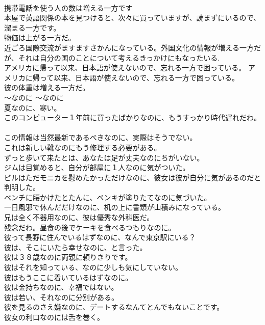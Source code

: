 \documentclass[8pt]{extreport}
\begin{document}
\begin{CJK}{UTF8}{min}
\\	携帯電話を使う人の数は増える一方です  
\\	本屋で英語関係の本を見つけると、次々に買っていますが、読まずにいるので、溜まる一方です。  
\\	物価は上がる一方だ。  
\\	近ごろ国際交流がますますさかんになっている。外国文化の情報が増える一方だが、それは自分の国のことについて考えるきっかけにもなったいる.  
\\	アメリカに帰って以来、日本語が使えないので、忘れる一方で困っている。 アメリカに帰って以来、日本語が使えないので、忘れる一方で困っている。  
\\	彼の体重は増える一方だ。  
\\	〜なのに	〜なのに	
\\	夏なのに、寒い。	
\\	このコンピューター１年前に買ったばかりなのに、もうすっかり時代遅れだわ。   
\\	この情報は当然最新であるべきなのに、実際はそうでない。   
\\	これは新しい靴なのにもう修理する必要がある。   
\\	ずっと歩いて来たとは、あなたは足が丈夫なのにちがいない。   
\\	ジムは目覚めると、自分が部屋に１人なのに気がついた。   
\\	ビルはただモニカを慰めたかっただけなのに、彼女は彼が自分に気があるのだと判明した。   
\\	ベンチに腰かけたとたんに、ペンキが塗りたてなのに気づいた。   
\\	一日風邪で休んだだけなのに、机の上に書類が山積みになっている。   
\\	兄は全く不器用なのに、彼は優秀な外科医だ。   
\\	残念だわ。昼食の後でケーキを食べるつもりなのに。   
\\	彼って長野に住んでいるはずなのに、なんで東京駅にいる？   
\\	彼は、そこにいたら幸せなのに、と言った。   
\\	彼は３８歳なのに両親に頼りきりです。   
\\	彼はそれを知っている、なのに少しも気にしていない。   
\\	彼はもうここに着いているはずなのに。   
\\	彼は金持ちなのに、幸福ではない。   
\\	彼は若い、それなのに分別がある。   
\\	彼を見るのさえ嫌なのに、デートするなんてとんでもないことです。   
\\	彼女の利口なのには舌を巻く。   

\end{CJK}
\end{document}
